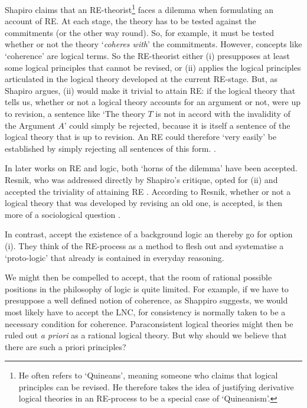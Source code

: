\documentclass{article}
\begin{document}
Shapiro claims that an RE-theorist\footnote{He often refers to `Quineans', meaning someone who claims that logical principles can be revised. He therefore takes the idea of justifying derivative logical theories in an RE-process to be a special case of `Quineanism'.} faces a dilemma when formulating an account of RE. At each stage, the theory has to be tested against the commitments (or the other way round). So, for example, it must be tested whether or not the theory `\textit{coheres with}' \cite[p.~346]{shapiro} the commitments. However, concepts like `coherence' are logical terms. So the RE-theorist either (i) presupposes at least some logical principles that cannot be revised, or (ii) applies the logical principles articulated in the logical theory developed at the current RE-stage. But, as Shapiro argues, (ii) would make it trivial to attain RE: if the logical theory that tells us, whether or not a logical theory accounts for an argument or not, were up to revision, a sentence like `The theory $T$ is not in accord with the invalidity of the Argument $A$' \cite[p.~346]{shapiro} could simply be rejected, because it is itself a sentence of the logical theory that is up to revision. An RE could therefore `very easily' be established by simply rejecting all sentences of this form. \cite[p~346-367]{shapiro}.

In later works on RE and logic, both `horns of the dilemma' have been accepted. Resnik, who was addressed directly by Shapiro's critique, opted for (ii) and accepted the triviality of attaining RE \cite[p.~193]{resnik2}. According to Resnik, whether or not a logical theory that was developed by revising an old one, is accepted, is then more of a sociological question \cite[p.~190]{resnik2}.

In contrast,  accept the existence of a background logic an thereby go for option (i). They think of the RE-process as a method to flesh out and systematise a `proto-logic' \cite[p.~97]{peregrinsvoboda} that already is contained in everyday reasoning. \cite[p.~95-105]{peregrinsvoboda}

We might then be compelled to accept, that the room of rational possible positions in the philosophy of logic is quite limited. For example, if we have to presuppose a well defined notion of coherence, as Shappiro suggests, we would most likely have to accept the LNC, for consistency is normally taken to be a necessary condition for coherence. Paraconsistent logical theories might then be ruled out \textit{a priori} as a rational logical theory. But why should we believe that there are such a priori principles? 
\end{document}
